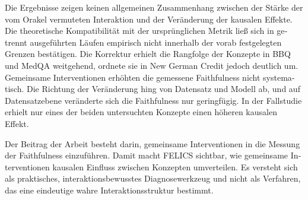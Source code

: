 \begin{otherlanguage}{ngerman}
	Die Ergebnisse zeigen keinen allgemeinen Zusammenhang zwischen der Stärke der
	vom Orakel vermuteten Interaktion und der Veränderung der kausalen Effekte.
	Die theoretische Kompatibilität mit der ursprünglichen Metrik ließ sich in
	getrennt ausgeführten Läufen empirisch nicht innerhalb der vorab festgelegten
	Grenzen bestätigen. Die Korrektur erhielt die Rangfolge der Konzepte in BBQ und
	MedQA weitgehend, ordnete sie in New German Credit jedoch deutlich um.
	Gemeinsame Interventionen erhöhten die gemessene Faithfulness nicht systematisch. Die
	Richtung der Veränderung hing von Datensatz und Modell ab, und auf
	Datensatzebene veränderte sich die Faithfulness nur geringfügig. In der Fallstudie
	erhielt nur eines der beiden untersuchten Konzepte einen höheren kausalen
	Effekt.

	Der Beitrag der Arbeit besteht darin, gemeinsame Interventionen in die Messung
	der Faithfulness einzuführen. Damit macht FELICS sichtbar, wie
	gemeinsame Interventionen kausalen Einfluss zwischen Konzepten umverteilen. Es
	versteht sich als praktisches, interaktionsbewusstes Diagnosewerkzeug und nicht
	als Verfahren, das eine eindeutige wahre Interaktionsstruktur bestimmt.

	\endgroup
\end{otherlanguage}
